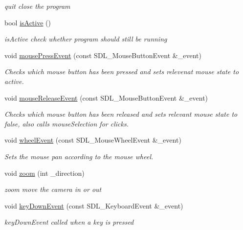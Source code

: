 \begin{DoxyCompactItemize}
\begin{DoxyCompactList}\small\item\em quit close the program \end{DoxyCompactList}\item 
bool \hyperlink{class_scene_aac02dec89aa4d67ea4187b9decf4f772}{is\+Active} ()
\begin{DoxyCompactList}\small\item\em is\+Active check whether program should still be running \end{DoxyCompactList}\item 
void \hyperlink{class_scene_ac54bef2fcf9164ad1ffc632cf549620c}{mouse\+Press\+Event} (const S\+D\+L\+\_\+\+Mouse\+Button\+Event \&\+\_\+event)
\begin{DoxyCompactList}\small\item\em Checks which mouse button has been pressed and sets relevenat mouse state to active. \end{DoxyCompactList}\item 
void \hyperlink{class_scene_ac4cc3bf5097dbe7ef52ca7192c6af779}{mouse\+Release\+Event} (const S\+D\+L\+\_\+\+Mouse\+Button\+Event \&\+\_\+event)
\begin{DoxyCompactList}\small\item\em Checks which mouse button has been released and sets relevant mouse state to false, also calls mouse\+Selection for clicks. \end{DoxyCompactList}\item 
void \hyperlink{class_scene_a1eabb6ccf35b335f8213d0d532d9f1cb}{wheel\+Event} (const S\+D\+L\+\_\+\+Mouse\+Wheel\+Event \&\+\_\+event)
\begin{DoxyCompactList}\small\item\em Sets the mouse pan according to the mouse wheel. \end{DoxyCompactList}\item 
void \hyperlink{class_scene_a9d27776b008877319a9bb6e1ab548a55}{zoom} (int \+\_\+direction)
\begin{DoxyCompactList}\small\item\em zoom move the camera in or out \end{DoxyCompactList}\item 
void \hyperlink{class_scene_a5d470ed921657d92bf73f030db4b0188}{key\+Down\+Event} (const S\+D\+L\+\_\+\+Keyboard\+Event \&\+\_\+event)
\begin{DoxyCompactList}\small\item\em key\+Down\+Event called when a key is pressed \end{DoxyCompactList}\item 

\end{DoxyCompactItemize}

